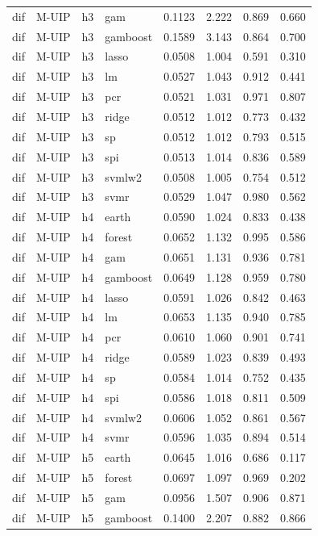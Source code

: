 \begin{ThreePartTable}
\begin{longtable}[t]{llclcccc}
dif & M-UIP & h3 & gam & 0.1123 & 2.222 & 0.869 & 0.660\\
dif & M-UIP & h3 & gamboost & 0.1589 & 3.143 & 0.864 & 0.700\\
dif & M-UIP & h3 & lasso & 0.0508 & 1.004 & 0.591 & 0.310\\
dif & M-UIP & h3 & lm & 0.0527 & 1.043 & 0.912 & 0.441\\
dif & M-UIP & h3 & pcr & 0.0521 & 1.031 & 0.971 & 0.807\\
dif & M-UIP & h3 & ridge & 0.0512 & 1.012 & 0.773 & 0.432\\
dif & M-UIP & h3 & sp & 0.0512 & 1.012 & 0.793 & 0.515\\
dif & M-UIP & h3 & spi & 0.0513 & 1.014 & 0.836 & 0.589\\
dif & M-UIP & h3 & svmlw2 & 0.0508 & 1.005 & 0.754 & 0.512\\
dif & M-UIP & h3 & svmr & 0.0529 & 1.047 & 0.980 & 0.562\\
\addlinespace
dif & M-UIP & h4 & earth & 0.0590 & 1.024 & 0.833 & 0.438\\
dif & M-UIP & h4 & forest & 0.0652 & 1.132 & 0.995 & 0.586\\
dif & M-UIP & h4 & gam & 0.0651 & 1.131 & 0.936 & 0.781\\
dif & M-UIP & h4 & gamboost & 0.0649 & 1.128 & 0.959 & 0.780\\
dif & M-UIP & h4 & lasso & 0.0591 & 1.026 & 0.842 & 0.463\\
dif & M-UIP & h4 & lm & 0.0653 & 1.135 & 0.940 & 0.785\\
dif & M-UIP & h4 & pcr & 0.0610 & 1.060 & 0.901 & 0.741\\
dif & M-UIP & h4 & ridge & 0.0589 & 1.023 & 0.839 & 0.493\\
dif & M-UIP & h4 & sp & 0.0584 & 1.014 & 0.752 & 0.435\\
dif & M-UIP & h4 & spi & 0.0586 & 1.018 & 0.811 & 0.509\\
dif & M-UIP & h4 & svmlw2 & 0.0606 & 1.052 & 0.861 & 0.567\\
dif & M-UIP & h4 & svmr & 0.0596 & 1.035 & 0.894 & 0.514\\
\addlinespace
dif & M-UIP & h5 & earth & 0.0645 & 1.016 & 0.686 & 0.117\\
dif & M-UIP & h5 & forest & 0.0697 & 1.097 & 0.969 & 0.202\\
dif & M-UIP & h5 & gam & 0.0956 & 1.507 & 0.906 & 0.871\\
dif & M-UIP & h5 & gamboost & 0.1400 & 2.207 & 0.882 & 0.866\\

\end{longtable}
\end{ThreePartTable}
